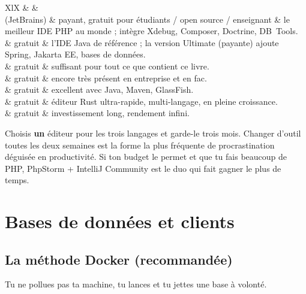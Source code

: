 \begin{tabz}{XlX}
  \headrow {} \&  \&  \\
  \midrule
   (JetBrains) \& payant, gratuit pour \'etudiants / open source / enseignant \& le meilleur IDE PHP au monde ; int\`egre Xdebug, Composer, Doctrine, DB~Tools. \\
   \& gratuit \& l'IDE Java de r\'ef\'erence ; la version Ultimate (payante) ajoute Spring, Jakarta EE, bases de donn\'ees. \\
   \& gratuit \& suffisant pour tout ce que contient ce livre. \\
   \& gratuit \& encore tr\`es pr\'esent en entreprise et en fac. \\
   \& gratuit \& excellent avec Java, Maven, GlassFish. \\
   \& gratuit \& \'editeur Rust ultra-rapide, multi-langage, en pleine croissance. \\
   \& gratuit \& investissement long, rendement infini. \\
\end{tabz}

\begin{astuce}
Choisis \textbf{un} \'editeur pour les trois langages et garde-le trois mois. Changer d'outil
 toutes les deux semaines est la forme la plus fr\'equente de procrastination d\'eguis\'ee en
 productivit\'e. Si ton budget le permet et que tu fais beaucoup de PHP, PhpStorm + IntelliJ
 Community est le duo qui fait gagner le plus de temps.
\end{astuce}

\section{Bases de donn\'ees et clients}

\subsection{La m\'ethode Docker (recommand\'ee)}

Tu ne pollues pas ta machine, tu lances et tu jettes une base \`a volont\'e.

